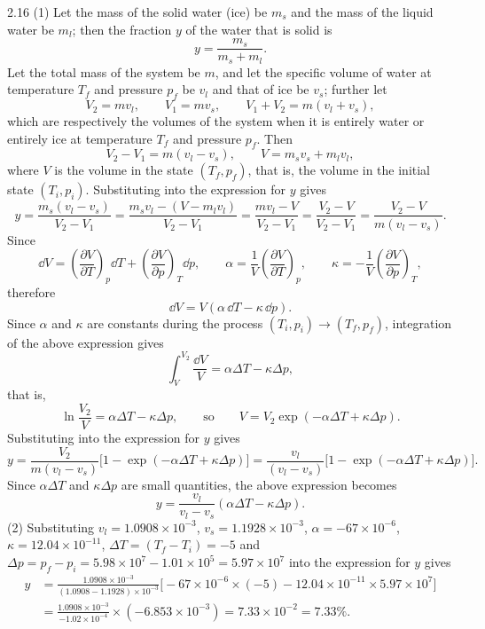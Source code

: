 \begin{solution}{2.16}
(1) Let the mass of the solid water (ice) be $m_s$ and the mass of the liquid water be $m_l$; then the fraction $y$ of the water that is solid is
\[
y=\frac{m_s}{m_s+m_l}.
\]
Let the total mass of the system be $m$, and let the specific volume of water at temperature $T_f$ and pressure $p_f$ be $v_l$ and that of ice be $v_s$; further let
\[
V_2=mv_l,\qquad V_1=mv_s,\qquad V_1+V_2=m(v_l+v_s),
\]
which are respectively the volumes of the system when it is entirely water or entirely ice at temperature $T_f$ and pressure $p_f$. Then
\[
V_2-V_1=m(v_l-v_s),\qquad V=m_sv_s+m_lv_l,
\]
where $V$ is the volume in the state $(T_f,p_f)$, that is, the volume in the initial state $(T_i,p_i)$. Substituting into the expression for $y$ gives
\[
y=\frac{m_s(v_l-v_s)}{V_2-V_1}
=\frac{m_sv_l-(V-m_lv_l)}{V_2-V_1}
=\frac{mv_l-V}{V_2-V_1}
=\frac{V_2-V}{V_2-V_1}
=\frac{V_2-V}{m(v_l-v_s)}.
\]
Since
\[
\dd V=\left(\frac{\partial V}{\partial T}\right)_p\dd T+\left(\frac{\partial V}{\partial p}\right)_T\dd p,
\qquad
\alpha=\frac{1}{V}\left(\frac{\partial V}{\partial T}\right)_p,
\qquad
\kappa=-\frac{1}{V}\left(\frac{\partial V}{\partial p}\right)_T,
\]
therefore
\[
\dd V=V(\alpha\,\dd T-\kappa\,\dd p).
\]
Since $\alpha$ and $\kappa$ are constants during the process $(T_i,p_i)\to(T_f,p_f)$, integration of the above expression gives
\[
\int_V^{V_2}\frac{\dd V}{V}=\alpha\Delta T-\kappa\Delta p,
\]
that is,
\[
\ln\frac{V_2}{V}=\alpha\Delta T-\kappa\Delta p,
\qquad\text{so}\qquad
V=V_2\exp(-\alpha\Delta T+\kappa\Delta p).
\]
Substituting into the expression for $y$ gives
\[
y=\frac{V_2}{m(v_l-v_s)}\bigl[1-\exp(-\alpha\Delta T+\kappa\Delta p)\bigr]
=\frac{v_l}{(v_l-v_s)}\bigl[1-\exp(-\alpha\Delta T+\kappa\Delta p)\bigr].
\]
Since $\alpha\Delta T$ and $\kappa\Delta p$ are small quantities, the above expression becomes
\[
y=\frac{v_l}{v_l-v_s}(\alpha\Delta T-\kappa\Delta p).
\]
(2) Substituting $v_l=1.0908\times10^{-3}$, $v_s=1.1928\times10^{-3}$, $\alpha=-67\times10^{-6}$, $\kappa=12.04\times10^{-11}$, $\Delta T=(T_f-T_i)=-5$ and $\Delta p=p_f-p_i=5.98\times10^{7}-1.01\times10^{5}=5.97\times10^{7}$ into the expression for $y$ gives
\[
\begin{aligned}
y&=\frac{1.0908\times10^{-3}}{(1.0908-1.1928)\times10^{-3}}
\bigl[-67\times10^{-6}\times(-5)-12.04\times10^{-11}\times5.97\times10^{7}\bigr]\\[4pt]
&=\frac{1.0908\times10^{-3}}{-1.02\times10^{-4}}\times(-6.853\times10^{-3})
=7.33\times10^{-2}=7.33\%.
\end{aligned}
\]
\end{solution}

